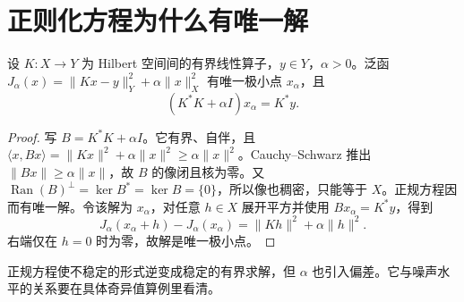 \section{正则化方程为什么有唯一解}

\begin{proposition}
设 \(K:X\to Y\) 为 Hilbert 空间间的有界线性算子，\(y\in Y\)，\(\alpha>0\)。泛函 \(J_\alpha(x)=\|Kx-y\|_Y^2+\alpha\|x\|_X^2\) 有唯一极小点 \(x_\alpha\)，且
\[
(K^*K+\alpha I)x_\alpha=K^*y.
\]
\end{proposition}
\begin{proof}
写 \(B=K^*K+\alpha I\)。它有界、自伴，且 \(\langle x,Bx\rangle=\|Kx\|^2+\alpha\|x\|^2\ge\alpha\|x\|^2\)。Cauchy--Schwarz 推出 \(\|Bx\|\ge\alpha\|x\|\)，故 \(B\) 的像闭且核为零。又 \(\operatorname{Ran}(B)^\perp=\ker B^*=\ker B=\{0\}\)，所以像也稠密，只能等于 \(X\)。正规方程因而有唯一解。令该解为 \(x_\alpha\)，对任意 \(h\in X\) 展开平方并使用 \(Bx_\alpha=K^*y\)，得到
\[
J_\alpha(x_\alpha+h)-J_\alpha(x_\alpha)
=\|Kh\|^2+\alpha\|h\|^2.
\]
右端仅在 \(h=0\) 时为零，故解是唯一极小点。
\end{proof}

正规方程使不稳定的形式逆变成稳定的有界求解，但 \(\alpha\) 也引入偏差。它与噪声水平的关系要在具体奇异值算例里看清。
